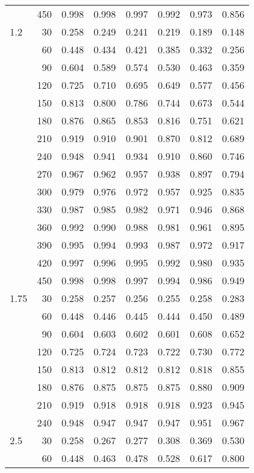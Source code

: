 \documentclass[bimj,fleqn]{w-art}\usepackage[]{graphicx}\usepackage[]{color}
\theoremstyle{plain}
\theoremstyle{definition}
\begin{document}
\begin{table}[ht]
\begin{tabular}{lrrrrrrr}
   & 450 & 0.998 & 0.998 & 0.997 & 0.992 & 0.973 & 0.856 \\ 
  1.2 & 30 & 0.258 & 0.249 & 0.241 & 0.219 & 0.189 & 0.148 \\ 
   & 60 & 0.448 & 0.434 & 0.421 & 0.385 & 0.332 & 0.256 \\ 
   & 90 & 0.604 & 0.589 & 0.574 & 0.530 & 0.463 & 0.359 \\ 
   & 120 & 0.725 & 0.710 & 0.695 & 0.649 & 0.577 & 0.456 \\ 
   & 150 & 0.813 & 0.800 & 0.786 & 0.744 & 0.673 & 0.544 \\ 
   & 180 & 0.876 & 0.865 & 0.853 & 0.816 & 0.751 & 0.621 \\ 
   & 210 & 0.919 & 0.910 & 0.901 & 0.870 & 0.812 & 0.689 \\ 
   & 240 & 0.948 & 0.941 & 0.934 & 0.910 & 0.860 & 0.746 \\ 
   & 270 & 0.967 & 0.962 & 0.957 & 0.938 & 0.897 & 0.794 \\ 
   & 300 & 0.979 & 0.976 & 0.972 & 0.957 & 0.925 & 0.835 \\ 
   & 330 & 0.987 & 0.985 & 0.982 & 0.971 & 0.946 & 0.868 \\ 
   & 360 & 0.992 & 0.990 & 0.988 & 0.981 & 0.961 & 0.895 \\ 
   & 390 & 0.995 & 0.994 & 0.993 & 0.987 & 0.972 & 0.917 \\ 
   & 420 & 0.997 & 0.996 & 0.995 & 0.992 & 0.980 & 0.935 \\ 
   & 450 & 0.998 & 0.998 & 0.997 & 0.994 & 0.986 & 0.949 \\ 
  1.75 & 30 & 0.258 & 0.257 & 0.256 & 0.255 & 0.258 & 0.283 \\ 
   & 60 & 0.448 & 0.446 & 0.445 & 0.444 & 0.450 & 0.489 \\ 
   & 90 & 0.604 & 0.603 & 0.602 & 0.601 & 0.608 & 0.652 \\ 
   & 120 & 0.725 & 0.724 & 0.723 & 0.722 & 0.730 & 0.772 \\ 
   & 150 & 0.813 & 0.812 & 0.812 & 0.812 & 0.818 & 0.855 \\ 
   & 180 & 0.876 & 0.875 & 0.875 & 0.875 & 0.880 & 0.909 \\ 
   & 210 & 0.919 & 0.918 & 0.918 & 0.918 & 0.923 & 0.945 \\ 
   & 240 & 0.948 & 0.947 & 0.947 & 0.947 & 0.951 & 0.967 \\ 
  2.5 & 30 & 0.258 & 0.267 & 0.277 & 0.308 & 0.369 & 0.530 \\ 
   & 60 & 0.448 & 0.463 & 0.478 & 0.528 & 0.617 & 0.800 \\ 

\end{tabular}
\end{table}
\end{document}

